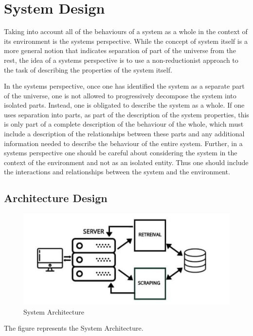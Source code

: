 \chapter{System Design}Taking into account all of the behaviours of a system as a whole in the context of its environment is the systems perspective. While the concept of system itself is a more general notion that indicates separation of part of the universe from the rest, the idea of a systems perspective is to use a non-reductionist approach to the task of describing the properties of the system itself.

In the systems perspective, once one has identified the system as a separate part of the universe, one is not allowed to progressively decompose the system into isolated parts. Instead, one is obligated to describe the system as a whole. If one uses separation into parts, as part of the description of the system properties, this is only part of a complete description of the behaviour of the whole, which must include a description of the relationships between these parts and any additional information needed to describe the behaviour of the entire system. Further, in a systems perspective one should be careful about considering the system in the context of the environment and not as an isolated entity. Thus one should include the interactions and relationships between the system and the environment.


\section{Architecture Design}


\begin{figure}[htpb]
\centering
\includegraphics[width=\textwidth,height=\textheight,keepaspectratio]{../static/media/SystemArchitecture.png}
\caption{System Architecture}
\end{figure}
The figure represents the System Architecture.